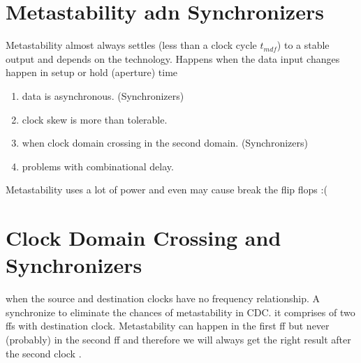 \section{Metastability adn Synchronizers}
Metastability almost always settles (less than a clock cycle \(t_{mdf}\)) to a stable output and depends on the technology. Happens when the data input changes happen in setup or hold (aperture) time
\begin{enumerate}
    \item data is asynchronous. (Synchronizers)
    \item clock skew is more than tolerable.
    \item when clock domain crossing in the second domain. (Synchronizers)
    \item problems with combinational delay.
\end{enumerate}
Metastability uses a lot of power and even may cause break the flip flops :(
\section{Clock Domain Crossing and Synchronizers}
when the source and destination clocks have no frequency relationship. A synchronize to eliminate the chances of metastability in CDC. it comprises of two ffs with destination clock. Metastability can happen in the first ff but never (probably) in the second ff and therefore we will always get the right result after the second clock .